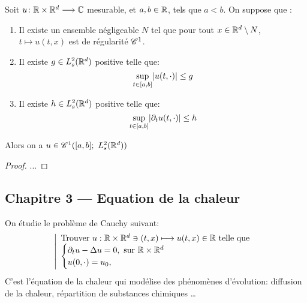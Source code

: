 \documentclass[french,a4paper,10pt]{article}
\begin{document}
            \begin{proposition}\label{prop:2.4.7}
                Soit $u\colon \mathbb{R} \times \mathbb{R}^d \longrightarrow \mathbb{C}$ mesurable, et $a,b \in \mathbb{R}$, tels que $a<b$. On suppose que :
                \begin{enumerate}
                    \item Il existe un ensemble négligeable $N$ tel que pour tout $x \in \mathbb{R}^d\setminus N$, $t \longmapsto u(t,x) $ est de régularité $\mathscr{C}^1$.

                    \item Il existe $g \in L^2_s(\mathbb{R}^d)$ positive telle que: 
                    \begin{equation*}
                        \sup\limits_{t\in \mathopen{}\left[a,b\right]\mathclose{}}\mathopen{}\left|u(t,\cdot)\right|\mathclose{} \leq g
                    \end{equation*}

                    \item Il existe $h \in L^2_s(\mathbb{R}^d)$ positive telle que: 
                    \begin{equation*}
                        \sup\limits_{t\in \mathopen{}\left[a,b\right]\mathclose{}}\mathopen{}\left|\mathop{}\!{\partial}_tu(t,\cdot)\right|\mathclose{} \leq h
                    \end{equation*}
                \end{enumerate}
                Alors on a $u\in \C^1(\ff{a,b}; \ L^2_s(\R^d))$
                
            \end{proposition}

            \begin{proof}
                ...
            \end{proof}


    \newpage
    \begin{center}
        \section*{Chapitre 3 --- Equation de la chaleur}\label{sec:CH3}
    \end{center}
    
    \setcounter{section}{3}
    \setcounter{subsection}{0}

        On étudie le problème de Cauchy suivant: 
        \begin{equation}\label{eq:5}
            \left| 
            \begin{array}{l}
                \text{Trouver } u:\mathbb{R} \times \mathbb{R}^d \ni (t,x) \longmapsto u(t,x) \in \mathbb{R} \text{ telle que } \\
                \begin{cases}
                    \mathop{}\!{\partial}_tu- \Delta u = 0, \text{ sur } \mathbb{R} \times \mathbb{R}^d\\
                    u(0,\cdot) = u_0,
                \end{cases} \\[10pt]
            \end{array}
            \right.
        \end{equation}
        C'est l'équation de la chaleur qui modélise des phénomènes d'évolution: diffusion de la chaleur, répartition de substances chimiques \dots
\end{document}
